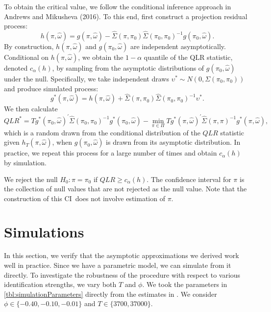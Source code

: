 \documentclass[11pt, letterpaper, twoside]{article}
\begin{document}
To obtain the critical value, we follow the conditional inference approach in Andrews and Mikusheva (2016). To
this end, first construct a projection residual process:
%
\begin{equation}
 h(\pi ,\widehat{\omega})=g(\pi ,\widehat{\omega})-\widehat{\Sigma}(\pi ,\pi_{0})\widehat{\Sigma
 }(\pi_{0},\pi_{0})^{-1}g(\pi_{0},\widehat{\omega}).
\end{equation}
%
By construction, $h(\pi ,\widehat{\omega})$ and $g(\pi_{0},\widehat{\omega})$ are independent asymptotically. 
Conditional on $h(\pi ,\widehat{\omega})$, we obtain the $1-\alpha $ quantile of the QLR statistic, denoted
$c_{\alpha}(h)$, by sampling from the asymptotic distributions of $g(\pi_{0},\widehat{\omega})$ under the null.
Specifically, we take independent draws $\upsilon^{\ast}\sim N(0,\Sigma (\pi_{0},\pi_{0}))$ and produce simulated
process:
%
\begin{equation}
 g^{\ast}(\pi ,\widehat{\omega}) = h\left(\pi ,\widehat{\omega}\right) + \widehat{\Sigma} (\pi
 ,\pi_{0})\widehat{\Sigma}(\pi_{0},\pi_{0})^{-1}\upsilon^{\ast}.
\end{equation}%
%
We then calculate
\begin{equation}
 QLR^{\ast}=Tg^{\ast}(\pi_{0},\widehat{\omega})^{\prime}\widehat{\Sigma} (\pi_{0},\pi_{0})^{-1}g^{\ast
 }(\pi_{0},\widehat{\omega})-\underset{\pi \in \Pi}{\min}Tg^{\ast}(\pi ,\widehat{\omega})^{\prime
 }\widehat{\Sigma} (\pi ,\pi )^{-1}g^{\ast}(\pi ,\widehat{\omega}), 
\end{equation}
%
which is a random drawn from the conditional distribution of the $QLR$ statistic given $h_{T}(\pi ,\widehat{\omega
})$, when $g(\pi_{0},\widehat{ \omega})$ is drawn from its asymptotic distribution. 
In practice, we repeat this process for a large number of times and obtain $c_{\alpha}(h)$ by simulation.

We reject the null $H_{0}:\pi =\pi_{0}$ if $QLR\geq c_{\alpha}(h)$. 
The confidence interval for $\pi $ is the collection of null values that are not rejected as the null value. 
Note that the construction of this CI\ does not involve estimation of $\pi$.

\section{Simulations}\label{sec:simulation}

In this section, we verify that the asymptotic approximations we derived work well in practice.  Since we have a parametric model, we can simulate from it directly.  To investigate the robustness of the procedure with respect to various identification strengths, we vary both $T$ and $\phi$.
We took the parameters in \cref{tbl:simulationParameters} directly from the estimates in \textcite{han2018leverage}. 
We consider $\phi \in \lbrace -0.40, -0.10, -0.01 \rbrace$ and $T \in \lbrace 3700, 37000 \rbrace$. 
\end{document}
